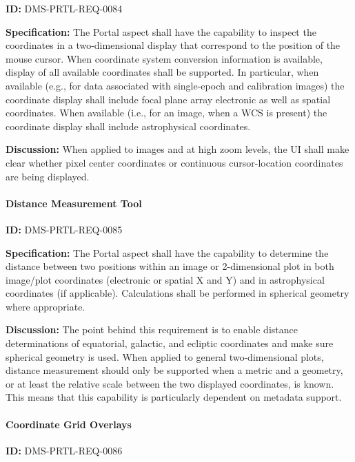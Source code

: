 \documentclass[SE,toc]{lsstdoc}
\begin{document}
\label{DMS-PRTL-REQ-0084}
\textbf{ID:} DMS-PRTL-REQ-0084

\textbf{Specification:}
The Portal aspect shall have the capability to inspect the coordinates in a two-dimensional display that correspond to the position of the mouse cursor.  When coordinate system conversion information is available, display of all available coordinates shall be supported.  In particular, when available (e.g., for data associated with single-epoch and calibration images) the coordinate display shall include focal plane array electronic as well as  spatial coordinates.  When available (i.e., for an image, when a WCS is present) the coordinate display shall include astrophysical coordinates.

\textbf{Discussion:}
When applied to images and at high zoom levels, the UI shall make clear whether pixel center coordinates or continuous cursor-location coordinates are being displayed.

\paragraph{Distance Measurement Tool}\hfill  %

\label{DMS-PRTL-REQ-0085}
\textbf{ID:} DMS-PRTL-REQ-0085

\textbf{Specification:}
The Portal aspect shall have the capability to determine the distance between two positions within an image or 2-dimensional plot in both image/plot coordinates (electronic or spatial X and Y) and in astrophysical coordinates (if applicable).  Calculations shall be performed in spherical geometry where appropriate.

\textbf{Discussion:}
The point behind this requirement is to enable distance determinations of equatorial, galactic, and ecliptic coordinates and make sure spherical geometry is used.
When applied to general two-dimensional plots, distance measurement should only be supported when a metric and a geometry, or at least the relative scale between the two displayed coordinates, is known.
This means that this capability is particularly dependent on metadata support.

\paragraph{Coordinate Grid Overlays}\hfill  %

\label{DMS-PRTL-REQ-0086}
\textbf{ID:} DMS-PRTL-REQ-0086
\end{document}
